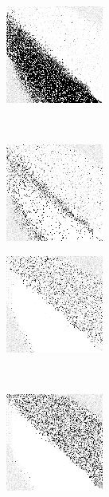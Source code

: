 \begin{figure}
\center

	\begin{subfigure}[b]{0.4\textwidth}
		\includegraphics[height=0.23\textheight]{images/findings/round1/strategies_handmaxmin_pone.png}
		\caption{\handmaxmin}
	\end{subfigure}
	~
	\begin{subfigure}[b]{0.4\textwidth}
		\includegraphics[height=0.23\textheight]{images/findings/round1/strategies_handmaxavg_pone.png}
		\caption{\handmaxavg}
	\end{subfigure}

	\begin{subfigure}[b]{0.4\textwidth}
		\includegraphics[height=0.23\textheight]{images/findings/round1/strategies_handmaxmed_pone.png}
		\caption{\handmaxmed}
	\end{subfigure}
	~
	\begin{subfigure}[b]{0.4\textwidth}
		\includegraphics[height=0.23\textheight]{images/findings/round1/strategies_handmaxposs_pone.png}
		\caption{\handmaxposs}
	\end{subfigure}


\end{figure}
